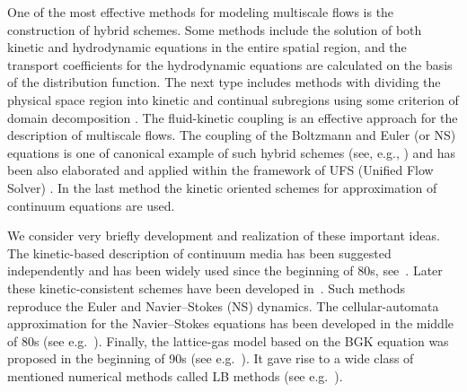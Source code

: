 \documentclass[]{elsarticle} %
\begin{document}
One of the most effective methods for modeling multiscale flows is the construction of hybrid schemes. Some methods include the solution of both kinetic and hydrodynamic equations in the entire spatial region, and the transport coefficients for the hydrodynamic equations are calculated on the basis of the distribution function. The next type includes methods with dividing the physical space region into kinetic and continual subregions using some criterion of domain decomposition \cite{Dimarco2014}. The fluid-kinetic coupling is an effective approach for the description of multiscale flows. The coupling of the Boltzmann and Euler (or NS) equations is one of canonical example of such hybrid schemes (see, e.g., \cite{Bourgat1996} \cite{Tallec1997}) and has been also elaborated and applied within the framework of UFS (Unified Flow Solver) \cite{Kolobov2007}. In the last method the kinetic oriented schemes for approximation of continuum equations are used.

We consider very briefly development and realization of these important ideas. The kinetic-based description of continuum media has been suggested independently and has been widely used since the beginning of 80s, see~\cite{Potkin1975, Pullin1980, Reitz1981, Aristov1983}. Later these kinetic-consistent schemes have been developed in~\cite{Elizarova1985, Deshpande1986, Prendergast1993, Chou1997, Ohwada2004Xu, Ohwada2004Kobayashi, Ohwada2006}. Such methods reproduce the Euler and Navier–Stokes (NS) dynamics. The cellular-automata approximation for the Navier–Stokes equations has been developed in the middle of 80s (see e.g.~\cite{Frisch1986}). Finally, the lattice-gas model based on the BGK equation was proposed in the beginning of 90s (see e.g.~\cite{Qian1992}). It gave rise to a wide class of mentioned numerical methods called LB methods (see e.g.~\cite{Succi2001}).
\end{document}
